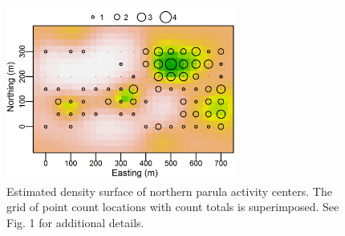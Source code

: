 \begin{figure}
  \centering
  \includegraphics[width=3in,height=2.25in]{Ch18-Unmarked/figs/nopaDen}
  \caption{Estimated density surface of northern parula activity
    centers. The grid of point count locations with count totals is
    superimposed. See Fig. 1 for additional details.  }
  \label{fig:nopaDen}
\end{figure}




